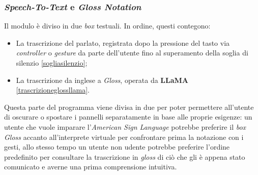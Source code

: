 \documentclass[12pt, a4paper]{article}
\begin{document}
        \subsubsection{\textit{Speech-To-Text} e \textit{Gloss Notation}}
            Il modulo è diviso in due \textit{box} testuali. In ordine, questi contegono: 
            \begin{itemize}
                \item La trascrizione del parlato, registrata dopo la pressione del tasto via 
                \textit{controller} o \textit{gesture} da parte dell'utente 
                fino al superamento della soglia di silenzio \ref{sogliasilenzio};
                \item La trascrizione da inglese a \textit{Gloss}, operata da \textbf{LLaMA} \ref{trascrizioneglossllama}.
            \end{itemize}
            Questa parte del programma viene divisa in due per poter permettere 
            all'utente di oscurare o spostare i pannelli separatamente in base alle 
            proprie esigenze:
            un utente che vuole imparare l'\textit{American Sign Language} 
            potrebbe preferire il \textit{box Gloss} accanto all'interprete virtuale 
            per confrontare prima la notazione con i gesti, 
            allo stesso tempo un utente non udente potrebbe preferire l'ordine 
            predefinito per consultare la trascrizione in \textit{gloss} 
            di ciò che gli è appena stato comunicato e averne una prima comprensione 
            intuitiva.
\end{document}
